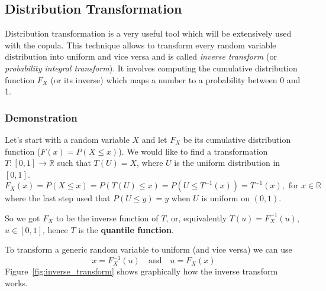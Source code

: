 
\subsection{Distribution Transformation}
\label{distribution-transformation}

Distribution transformation is a very useful tool which will be extensively used with the copula. This technique allows to transform every random variable distribution into uniform and vice versa and is called \emph{inverse transform} (or \emph{probability integral transform}).
It involves computing the cumulative distribution function $F_{X}$ (or its inverse) which maps a number to a probability between 0 and 1. 

\begin{attention}
\subsubsection{Demonstration}
Let's start with a random variable $X$ and let $F_X$ be its cumulative distribution function ($F(x) = P(X \leq x)$).
We would like to find a transformation $T:[0,1]\rightarrow\mathbb{R}$ such that $T(U)=X$, where $U$ is the uniform distribution in $[0,1]$. 
\begin{equation*}
F_X(x)= P(X\leq x)=P(T(U)\leq x)= P(U\leq T^{-1}(x))=T^{-1}(x),{\text{ for }}x\in \mathbb {R}
\end{equation*}
where the last step used that $P(U\leq y)=y$ when $U$ is uniform on $(0,1)$.

So we got $F_{X}$ to be the inverse function of $T$, or, equivalently $T(u)=F_{X}^{-1}(u)$, $u\in [0,1]$, hence $T$ is the \textbf{quantile function}.
\end{attention}

To transform a generic random variable to uniform (and vice versa) we can use
\begin{equation}
x = F_{X}^{-1}(u)\quad\mathrm{and}\quad u = F_X(x)	
\end{equation} 
\noindent Figure~\ref{fig:inverse_transform} shows graphically how the inverse transform works.

